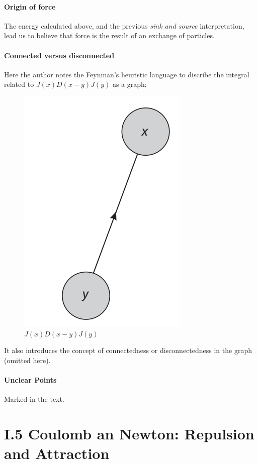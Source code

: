\documentclass{book}
\numberwithin{equation}{subsection} %
\theoremstyle{definition}
\begin{document}
\paragraph{Origin of force}
The energy calculated above, and the previous \textit{sink and source}
interpretation, lead us to believe that force is the result of an
exchange of particles.

\paragraph{Connected versus disconnected}
Here the author notes the Feynman's heuristic language to discribe
the integral related to $J(x)D(x-y)J(y)$ as a graph:
\begin{figure}[H]
    \centering
    \includegraphics[width=0.6\linewidth]{pics/J(x)D(x-y)J(y).png}
    \caption{$J(x)D(x-y)J(y)$}
\end{figure}
It also introduces the concept of connectedness or disconnectedness
in the graph (omitted here).

\paragraph{Unclear Points} Marked in the text.

\section{I.5 Coulomb an Newton: Repulsion and Attraction}
\end{document}
